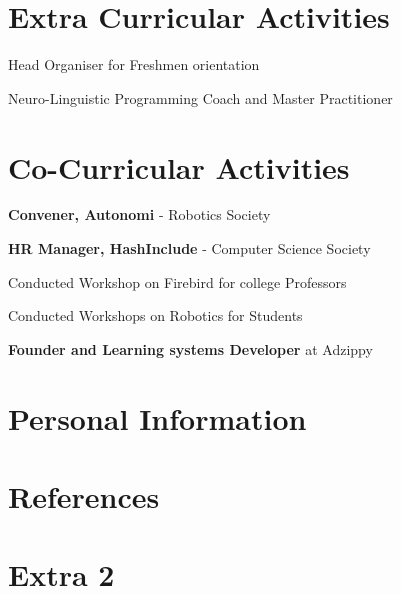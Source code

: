 \documentclass[11pt,a4paper,sans]{moderncv}        %
\begin{document}
\section{Extra Curricular Activities}
\begin{itemize}
{\setlength\itemindent{120pt} \item Head Organiser for Freshmen orientation}
{\setlength\itemindent{120pt} \item Neuro-Linguistic Programming Coach and Master Practitioner}
\end{itemize}

\section{Co-Curricular Activities}
\begin{enumerate}
{\setlength\itemindent{120pt} \item \textbf{Convener, Autonomi} - Robotics Society}
{\setlength\itemindent{120pt} \item \textbf{HR Manager, HashInclude} - Computer Science Society}
{\setlength\itemindent{120pt} \item Conducted Workshop on Firebird for college Professors}
{\setlength\itemindent{120pt} \item Conducted Workshops on Robotics for Students}
{\setlength\itemindent{120pt} \item \textbf{Founder and Learning systems Developer} at Adzippy}
\end{enumerate}

\section{Personal Information}

\section{References}
\begin{cvcolumns}
\end{cvcolumns}

\section{Extra 2}
\end{document}
